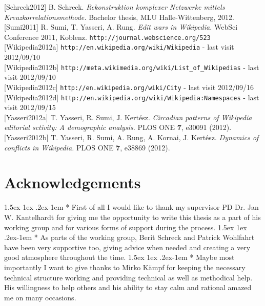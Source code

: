 \documentclass[a4paper,12pt,twoside]{article}
\makeatletter
\renewcommand{\paragraph}{%
  \@startsection{paragraph}{4}%
  {\z@}{1.5ex \@plus 1ex \@minus .2ex}{-1em}%
  {\normalfont\normalsize\bfseries}%
}
\newcommand{\blankpage}{ %
\newpage
\thispagestyle{empty}
\mbox{}
\newpage
}
\makeatother
\begin{document}
[{\sc Schreck}2012] {\sc B. Schreck}. \emph{Rekonstruktion komplexer Netzwerke mittels Kreuzkorrelationsmethode.} Bachelor thesis, MLU Halle-Wittenberg, 2012. \\[6pt]
[{\sc Sumi}2011] {\sc R. Sumi, T. Yasseri, A. Rung}. \emph{Edit wars in Wikipedia.} WebSci Conference 2011, Koblenz. {\tt http://journal.webscience.org/523} \\[6pt]
[{\sc Wikipedia}2012a] {\tt http://en.wikipedia.org/wiki/Wikipedia} - last visit 2012/09/10 \\[6pt]
[{\sc Wikipedia}2012b] {\tt http://meta.wikimedia.org/wiki/List\_of\_Wikipedias} - last visit 2012/09/10 \\[6pt]
[{\sc Wikipedia}2012c] {\tt http://en.wikipedia.org/wiki/City} - last visit 2012/09/16 \\[6pt]
[{\sc Wikipedia}2012d] {\tt http://en.wikipedia.org/wiki/Wikipedia:Namespaces} - last visit 2012/09/15 \\[6pt]
[{\sc Yasseri}2012a] {\sc T. Yasseri, R. Sumi, J. Kertész}. \emph{Circadian patterns of Wikipedia editorial sctivity: A demographic analysis.} PLOS ONE {\bf 7}, e30091 (2012).\\[6pt]
[{\sc Yasseri}2012b] {\sc T. Yasseri, R. Sumi, A. Rung, A. Kornai, J. Kertész}. \emph{Dynamics of conflicts in Wikipedia.} PLOS ONE {\bf 7}, e38869 (2012).\\[6pt]
\newpage
\blankpage
\section*{Acknowledgements}
\paragraph*{} First of all I would like to thank my supervisor PD Dr. Jan W. Kantelhardt for giving me the opportunity to write this thesis as a part of his working group and for various forms of support during the process.
\paragraph*{} As parts of the working group, Berit Schreck and Patrick Wohlfahrt have been very supportive too, giving advice when needed and creating a very good atmosphere throughout the time.
\paragraph*{} Maybe most importantly I want to give thanks to Mirko Kämpf for keeping the necessary technical structure working and providing technical as well as methodical help. His willingness to help others and his ability to stay calm and rational amazed me on many occasions.
\end{document}
